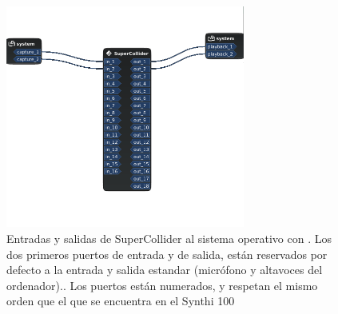 \begin{figure}
	\centering
	\includegraphics[width=0.7\textwidth]{images/entradas_salidas}
	\caption[Entradas y salidas al sistema]{Entradas y salidas de SuperCollider al sistema operativo con \appName. Los dos primeros puertos de entrada y de salida, están reservados por defecto a la entrada y salida estandar (micrófono y altavoces del ordenador).. Los puertos están numerados, y respetan el mismo orden que el que se encuentra en el Synthi 100}
	\label{fig:entradas_salidas}
\end{figure}